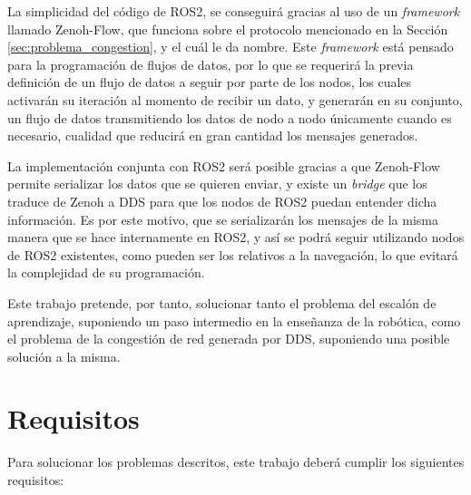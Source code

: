 La simplicidad del código de ROS2, se conseguirá gracias al uso de un
\textit{framework} llamado Zenoh-Flow, que funciona sobre el protocolo
mencionado en la Sección \ref{sec:problema_congestion}, y el cuál le da
nombre.
Este \textit{framework} está pensado para la programación de flujos de datos,
por lo que se requerirá la previa definición de un flujo de datos a seguir por
parte de los nodos, los cuales activarán su iteración al momento de recibir un
dato, y generarán en su conjunto, un flujo de datos transmitiendo los datos de
nodo a nodo únicamente cuando es necesario, cualidad que reducirá en gran
cantidad los mensajes generados.

La implementación conjunta con ROS2 será posible gracias a que Zenoh-Flow
permite serializar los datos que se quieren enviar, y existe un \textit{bridge}
que los traduce de Zenoh a DDS para que los nodos de ROS2 puedan entender dicha
información.
Es por este motivo, que se serializarán los mensajes de la misma manera que se
hace internamente en ROS2, y así se podrá seguir utilizando nodos de ROS2
existentes, como pueden ser los relativos a la navegación, lo que evitará la
complejidad de su programación.

Este trabajo pretende, por tanto, solucionar tanto el problema del escalón de
aprendizaje, suponiendo un paso intermedio en la enseñanza de la robótica, como
el problema de la congestión de red generada por DDS, suponiendo una posible
solución a la misma.


\section{Requisitos}
\label{sec:requisitos}

Para solucionar los problemas descritos, este trabajo deberá cumplir los
siguientes requisitos:

